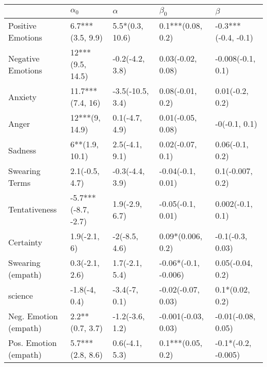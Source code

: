 \begin{tabular}{lllll}
\toprule
{} &           $\alpha_0$ &          $\alpha$ &             $\beta_0$ &              $\beta$ \\
\midrule
Positive Emotions     &     6.7***(3.5, 9.9) &   5.5*(0.3, 10.6) &     0.1***(0.08, 0.2) &  -0.3***(-0.4, -0.1) \\
Negative Emotions     &     12***(9.5, 14.5) &   -0.2(-4.2, 3.8) &     0.03(-0.02, 0.08) &    -0.008(-0.1, 0.1) \\
Anxiety               &     11.7***(7.4, 16) &  -3.5(-10.5, 3.4) &      0.08(-0.01, 0.2) &      0.01(-0.2, 0.2) \\
Anger                 &       12***(9, 14.9) &    0.1(-4.7, 4.9) &     0.01(-0.05, 0.08) &        -0(-0.1, 0.1) \\
Sadness               &       6**(1.9, 10.1) &    2.5(-4.1, 9.1) &      0.02(-0.07, 0.1) &      0.06(-0.1, 0.2) \\
Swearing Terms        &       2.1(-0.5, 4.7) &   -0.3(-4.4, 3.9) &     -0.04(-0.1, 0.01) &     0.1(-0.007, 0.2) \\
Tentativeness         &  -5.7***(-8.7, -2.7) &    1.9(-2.9, 6.7) &     -0.05(-0.1, 0.01) &     0.002(-0.1, 0.1) \\
Certainty             &         1.9(-2.1, 6) &     -2(-8.5, 4.6) &     0.09*(0.006, 0.2) &     -0.1(-0.3, 0.03) \\
Swearing (empath)     &       0.3(-2.1, 2.6) &    1.7(-2.1, 5.4) &  -0.06*(-0.1, -0.006) &     0.05(-0.04, 0.2) \\
science               &        -1.8(-4, 0.4) &     -3.4(-7, 0.1) &    -0.02(-0.07, 0.03) &      0.1*(0.02, 0.2) \\
Neg. Emotion (empath) &      2.2**(0.7, 3.7) &   -1.2(-3.6, 1.2) &   -0.001(-0.03, 0.03) &   -0.01(-0.08, 0.05) \\
Pos. Emotion (empath) &     5.7***(2.8, 8.6) &    0.6(-4.1, 5.3) &     0.1***(0.05, 0.2) &  -0.1*(-0.2, -0.005) \\
\bottomrule
\end{tabular}
